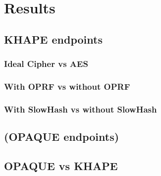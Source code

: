 \documentclass[../report.tex]{subfiles}
\begin{document}
\chapter{Results} %
 


\section{KHAPE endpoints} %

\subsection{Ideal Cipher vs AES} %

\subsection{With OPRF vs without OPRF} %

\subsection{With SlowHash vs without SlowHash} %


\section{(OPAQUE endpoints)} %


\section{OPAQUE vs KHAPE} %
\end{document}
